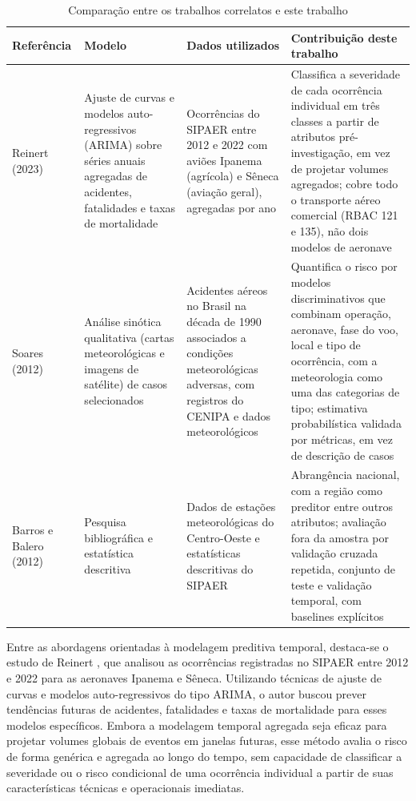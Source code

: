 \documentclass[12pt]{article}
\begin{document}
\begin{table}[tbp]
    \centering
    \caption{Comparação entre os trabalhos correlatos e este trabalho}
    \vspace{0.2cm}
    \footnotesize\setlength{\tabcolsep}{4pt}
    \begin{tabular}{>{\raggedright\arraybackslash}p{2.2cm}>{\raggedright\arraybackslash}p{3.1cm}>{\raggedright\arraybackslash}p{3.5cm}>{\raggedright\arraybackslash}p{4.9cm}}
        \toprule
        \textbf{Referência} & \textbf{Modelo} & \textbf{Dados utilizados} & \textbf{Contribuição deste trabalho} \\
        \midrule
        Reinert (2023) &
        Ajuste de curvas e modelos auto-regressivos (ARIMA) sobre séries anuais agregadas de acidentes, fatalidades e taxas de mortalidade &
        Ocorrências do SIPAER entre 2012 e 2022 com aviões Ipanema (agrícola) e Sêneca (aviação geral), agregadas por ano &
        Classifica a severidade de cada ocorrência individual em três classes a partir de atributos pré-investigação, em vez de projetar volumes agregados; cobre todo o transporte aéreo comercial (RBAC 121 e 135), não dois modelos de aeronave \\
        \midrule
        Soares (2012) &
        Análise sinótica qualitativa (cartas meteorológicas e imagens de satélite) de casos selecionados &
        Acidentes aéreos no Brasil na década de 1990 associados a condições meteorológicas adversas, com registros do CENIPA e dados meteorológicos &
        Quantifica o risco por modelos discriminativos que combinam operação, aeronave, fase do voo, local e tipo de ocorrência, com a meteorologia como uma das categorias de tipo; estimativa probabilística validada por métricas, em vez de descrição de casos \\
        \midrule
        Barros e Balero (2012) &
        Pesquisa bibliográfica e estatística descritiva &
        Dados de estações meteorológicas do Centro-Oeste e estatísticas descritivas do SIPAER &
        Abrangência nacional, com a região como preditor entre outros atributos; avaliação fora da amostra por validação cruzada repetida, conjunto de teste e validação temporal, com baselines explícitos \\
        \bottomrule
    \end{tabular}
    \label{tab:correlatos}
\end{table}

Entre as abordagens orientadas à modelagem preditiva temporal, destaca-se o estudo de Reinert \cite{reinert:2023}, que analisou as ocorrências registradas no SIPAER entre 2012 e 2022 para as aeronaves Ipanema e Sêneca. Utilizando técnicas de ajuste de curvas e modelos auto-regressivos do tipo ARIMA, o autor buscou prever tendências futuras de acidentes, fatalidades e taxas de mortalidade para esses modelos específicos. Embora a modelagem temporal agregada seja eficaz para projetar volumes globais de eventos em janelas futuras, esse método avalia o risco de forma genérica e agregada ao longo do tempo, sem capacidade de classificar a severidade ou o risco condicional de uma ocorrência individual a partir de suas características técnicas e operacionais imediatas.
\end{document}
